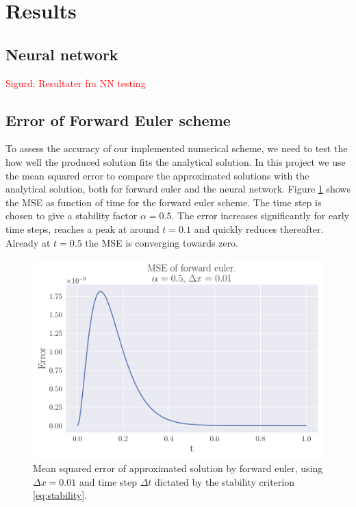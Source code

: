 \documentclass[12pt]{extarticle}
\begin{document}
\section{Results}

\subsection*{Neural network}
\textcolor{red}{Sigurd: Resultater fra NN testing}

\subsection*{Error of Forward Euler scheme}

To assess the accuracy of our implemented numerical scheme, we need to test the how well the produced solution fits the analytical solution. In this project we use the mean squared error to compare the approximated solutions with the analytical solution, both for forward euler and the neural network. Figure \ref{fig:FE_MSE} shows the MSE as function of time for the forward euler scheme. The time step is chosen to give a stability factor $\alpha=0.5$. The error increases significantly for early time steps, reaches a peak at around $t=0.1$ and quickly reduces thereafter. Already at $t=0.5$ the MSE is converging towards zero.

\begin{figure}[h]
	\centering
	\includegraphics[scale=0.5]{../output/plots/MSE_FE_dx_001.pdf}
	\caption{Mean squared error of approximated solution by forward euler, using $\Delta x=0.01$ and time step $\Delta t$ dictated by the stability criterion \eqref{eq:stability}.}
	\label{fig:FE_MSE}
\end{figure}
\end{document}
